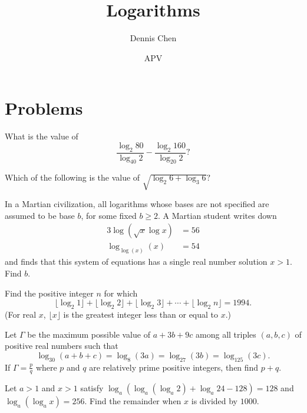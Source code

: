 \documentclass{article}
\title{Logarithms}
\author{Dennis Chen}
\date{APV}
\begin{document}
\maketitle



\pagebreak

\section{Problems}



\begin{req}[AMC 12B 2021/9]{2}
What is the value of \[\frac{\log_2 80}{\log_{40}2}-\frac{\log_2 160}{\log_{20}2}?\]
\end{req}

\begin{req}[AMC 12B 2020/13]{4}
Which of the following is the value of $\sqrt{\log_2{6}+\log_3{6}}?$

\end{req}

\begin{prob}[AIME II 2019/6]{4}
In a Martian civilization, all logarithms whose bases are not specified are assumed to be base $b$, for some fixed $b \geq 2$. A Martian student writes down\begin{align*}3 \log(\sqrt{x}\log x) &= 56\\\log_{\log (x)}(x) &= 54\end{align*}and finds that this system of equations has a single real number solution $x > 1$. Find $b$.
\end{prob}

\begin{prob}[AIME 1994/4]{4}
Find the positive integer $n$ for which \[ \lfloor \log_2{1}\rfloor+\lfloor\log_2{2}\rfloor+\lfloor\log_2{3}\rfloor+\cdots+\lfloor\log_2{n}\rfloor=1994.  \]  (For real $x$, $\lfloor x\rfloor$ is the greatest integer less than or equal to $x$.)
\end{prob}

\begin{prob}[PUMAC 2017]{6}
Let $\Gamma$ be the maximum possible value of $a+3b+9c$ among all triples $(a,b,c)$ of positive real numbers such that
\[ \log_{30}(a+b+c) = \log_{8}(3a) = \log_{27} (3b) = \log_{125} (3c) .\]If $\Gamma = \frac{p}{q}$ where $p$ and $q$ are relatively prime positive integers, then find $p+q$.
\end{prob}

\begin{prob}[AIME I 2017/14]{9}
Let $a > 1$ and $x > 1$ satisfy $\log_a(\log_a(\log_a 2) + \log_a 24 - 128) = 128$ and $\log_a(\log_a x) = 256$. Find the remainder when $x$ is divided by $1000$.
\end{prob}
\end{document}
